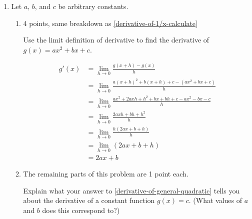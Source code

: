 \documentclass{article}
\begin{document}
\begin{enumerate}
\begin{enumerate}
  \end{enumerate}

\item  

  Let $a$, $b$, and $c$ be arbitrary constants. 

  \begin{enumerate}

  \item \label{derivative-of-general-quadratic}

    \begin{grading}
      4 points, same breakdown as \ref{derivative-of-1/x-calculate}
    \end{grading} 

    \begin{problem}[\vfill\newpage]
      Use the limit definition of derivative to find the derivative of
      $g(x) = {a}x^2 + bx + c$. 
    \end{problem}

    \begin{solution}       
      \begin{align*} 
        g'(x) &= \displaystyle \lim_{h \rightarrow 0} \frac{ g(x+h) - g(x)}{h} \\
        &= \displaystyle \lim_{h \rightarrow 0} \frac{ a(x+h)^2+b(x+h) +c - (ax^2+bx+c) } {h}\\
        & = \displaystyle \lim_{h \rightarrow 0} \frac{ ax^2+2axh+h^2 +bx+bh+c -ax^2-bx-c}{h}\\
        & = \displaystyle \lim_{h \rightarrow 0} \frac{ 2axh+bh+ h^2}{h} \\
        &= \displaystyle \lim_{h \rightarrow 0} \frac{h(2ax+b+h)}{h}\\
        &= \displaystyle \lim_{h \rightarrow 0} (2ax +b+h) \\
        &= 2ax+b
      \end{align*} 
    \end{solution} 

  \item \label{derivative-of-constant}

    \begin{grading}
      The remaining parts of this problem are 1 point each. 
    \end{grading}

    \begin{problem}[\vfill]
      Explain what your answer to \ref{derivative-of-general-quadratic} tells you about the derivative of a constant function $g(x) = c$. (What values of $a$ and $b$ does this correspond to?)
    \end{problem}


\end{enumerate}
\end{enumerate}
\end{document}
